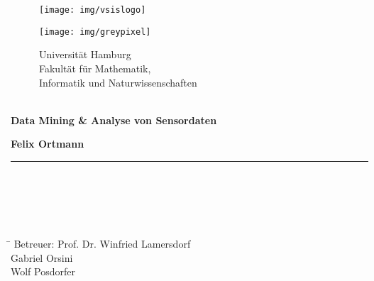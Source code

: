 \begin{titlepage}

  \setcounter{page}{-1}

	\begin{figure}[h]
		\begin{minipage}[b]{25mm}
			\texttt{[image: img/vsislogo]}
		\end{minipage}
		\begin{minipage}[b]{2mm}
			\texttt{[image: img/greypixel]}
		\end{minipage}
		\begin{minipage}[b]{12 cm}
			{\sffamily
				{\Large Universität Hamburg } \\
				Fakultät für Mathematik, \\
				Informatik und Naturwissenschaften \\
				\\
			}
		\end{minipage}
	\end{figure}

	\vfill
	
	\begin{center}
		\vspace{14mm}
		\noindent \textbf{\huge
		  Data Mining \& Analyse von Sensordaten\\
		}
		\vspace{60mm}	
	\end{center}
	
	\vfill
	
	\noindent \textbf{Felix Ortmann} \\
	\noindent \rule{\textwidth}{0.4mm} 
	 \\
	 \\
	 \\
	 \\
	\begin{tabbing}
	\hspace{8em} \=  \kill
	Betreuer: \> Prof. Dr. Winfried Lamersdorf \\
						\> Gabriel Orsini \\
						\> Wolf Posdorfer \\

	\end{tabbing}
	
	\newpage 
	\thispagestyle{empty}
	\setcounter{page}{0}
~

\end{titlepage}

